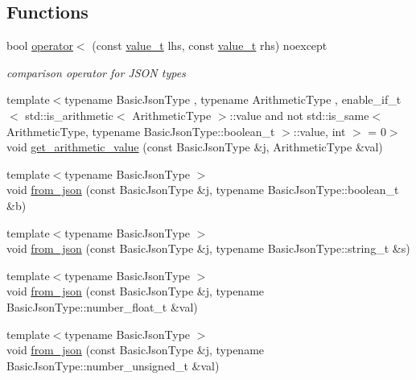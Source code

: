 \subsection*{Functions}
\begin{DoxyCompactItemize}
\item 
bool \hyperlink{namespacenlohmann_1_1detail_a09169efff3bd1771fff29bd92cea19e0}{operator$<$} (const \hyperlink{namespacenlohmann_1_1detail_a1ed8fc6239da25abcaf681d30ace4985}{value\+\_\+t} lhs, const \hyperlink{namespacenlohmann_1_1detail_a1ed8fc6239da25abcaf681d30ace4985}{value\+\_\+t} rhs) noexcept
\begin{DoxyCompactList}\small\item\em comparison operator for J\+S\+ON types \end{DoxyCompactList}\item 
{\footnotesize template$<$typename Basic\+Json\+Type , typename Arithmetic\+Type , enable\+\_\+if\+\_\+t$<$ std\+::is\+\_\+arithmetic$<$ Arithmetic\+Type $>$\+::value and not std\+::is\+\_\+same$<$ Arithmetic\+Type, typename Basic\+Json\+Type\+::boolean\+\_\+t $>$\+::value, int $>$  = 0$>$ }\\void \hyperlink{namespacenlohmann_1_1detail_a85955b9c6dd31846e4b8e891f78614b6}{get\+\_\+arithmetic\+\_\+value} (const Basic\+Json\+Type \&j, Arithmetic\+Type \&val)
\item 
{\footnotesize template$<$typename Basic\+Json\+Type $>$ }\\void \hyperlink{namespacenlohmann_1_1detail_a58117f225f43d03e3a0a4a6f3d77c9d9}{from\+\_\+json} (const Basic\+Json\+Type \&j, typename Basic\+Json\+Type\+::boolean\+\_\+t \&b)
\item 
{\footnotesize template$<$typename Basic\+Json\+Type $>$ }\\void \hyperlink{namespacenlohmann_1_1detail_ad74d89f77ada7a57eff38b43d4bf2335}{from\+\_\+json} (const Basic\+Json\+Type \&j, typename Basic\+Json\+Type\+::string\+\_\+t \&s)
\item 
{\footnotesize template$<$typename Basic\+Json\+Type $>$ }\\void \hyperlink{namespacenlohmann_1_1detail_a7cb5dd7d46a60e65f9a8e0873b3f7dd8}{from\+\_\+json} (const Basic\+Json\+Type \&j, typename Basic\+Json\+Type\+::number\+\_\+float\+\_\+t \&val)
\item 
{\footnotesize template$<$typename Basic\+Json\+Type $>$ }\\void \hyperlink{namespacenlohmann_1_1detail_ace4d5680ba413d9fd897ccb5d9c61a1c}{from\+\_\+json} (const Basic\+Json\+Type \&j, typename Basic\+Json\+Type\+::number\+\_\+unsigned\+\_\+t \&val)

\end{DoxyCompactItemize}
